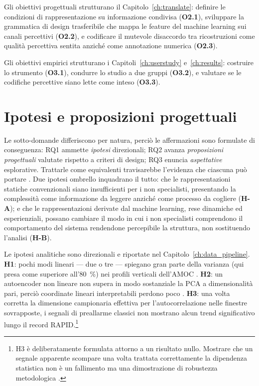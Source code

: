 Gli obiettivi progettuali strutturano il Capitolo~\ref{ch:translate}: definire le condizioni di rappresentazione su informazione condivisa (\textbf{O2.1}), sviluppare la grammatica di design trasferibile che mappa le feature del machine learning sui canali percettivi (\textbf{O2.2}), e codificare il mutevole disaccordo tra ricostruzioni come qualità percettiva sentita anziché come annotazione numerica (\textbf{O2.3}).

Gli obiettivi empirici strutturano i Capitoli~\ref{ch:userstudy} e~\ref{ch:results}: costruire lo strumento (\textbf{O3.1}), condurre lo studio a due gruppi (\textbf{O3.2}), e valutare se le codifiche percettive siano lette come inteso (\textbf{O3.3}).

\section{Ipotesi e proposizioni progettuali}
\label{sec:hypotheses}

Le sotto-domande differiscono per natura, perciò le affermazioni sono formulate di conseguenza: RQ1 ammette \emph{ipotesi} direzionali; RQ2 avanza \emph{proposizioni progettuali} valutate rispetto a criteri di design; RQ3 enuncia \emph{aspettative} esplorative. Trattarle come equivalenti travisarebbe l'evidenza che ciascuna può portare \citep{cronbach1975, mckenney2018}. Due ipotesi ombrello inquadrano il tutto: che le rappresentazioni statiche convenzionali siano insufficienti per i non specialisti, presentando la complessità come informazione da leggere anziché come processo da cogliere (\textbf{H-A}); e che le rappresentazioni derivate dal machine learning, rese dinamiche ed esperienziali, possano cambiare il modo in cui i non specialisti comprendono il comportamento del sistema rendendone percepibile la struttura, non sostituendo l'analisi (\textbf{H-B}).

Le ipotesi analitiche sono direzionali e riportate nel Capitolo~\ref{ch:data_pipeline}. \textbf{H1}: pochi modi lineari --- due o tre --- spiegano gran parte della varianza (qui presa come superiore all'\SI{80}{\percent}) nei profili verticali dell'AMOC \citep{buckley2016, hannachi2007}. \textbf{H2}: un autoencoder non lineare non supera in modo sostanziale la PCA a dimensionalità pari, perciò coordinate lineari interpretabili perdono poco \citep{baldi1989}. \textbf{H3}: una volta corretta la dimensione campionaria effettiva per l'autocorrelazione nelle finestre sovrapposte, i segnali di preallarme classici non mostrano alcun trend significativo lungo il record RAPID.\footnote{H3 è deliberatamente formulata attorno a un risultato nullo. Mostrare che un segnale apparente scompare una volta trattata correttamente la dipendenza statistica non è un fallimento ma una dimostrazione di robustezza metodologica \citep{dakos2012, scheffer2009}.}

